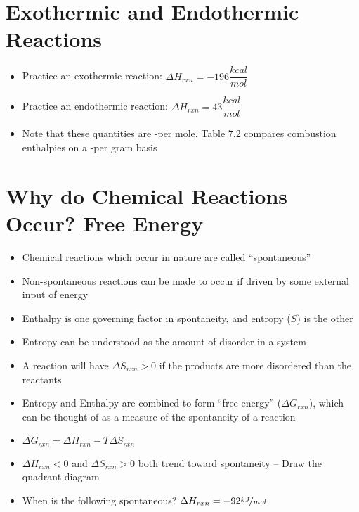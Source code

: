 \documentclass[12pt, openany, letterpaper]{memoir}
\begin{document}
\section{Exothermic and Endothermic Reactions}
\begin{itemize}
	\item Practice an exothermic reaction:  \hspace{1em} $\Delta H_{rxn}=-196\dfrac{kcal}{mol}$
	\item Practice an endothermic reaction:  \hspace{1em} $\Delta H_{rxn}=43\dfrac{kcal}{mol}$
	\item Note that these quantities are -per mole. Table 7.2 compares combustion enthalpies on a -per gram basis
\end{itemize}

\section{Why do Chemical Reactions Occur? Free Energy}
\begin{itemize}
	\item Chemical reactions which occur in nature are called ``spontaneous''
	\item Non-spontaneous reactions can be made to occur if driven by some external input of energy
	\item Enthalpy is one governing factor in spontaneity, and entropy ($S$) is the other
	\item Entropy can be understood as the amount of disorder in a system
	\item A reaction will have $\Delta S_{rxn}>0$ if the products are more disordered than the reactants
	\item Entropy and Enthalpy are combined to form ``free energy'' ($\Delta G_{rxn}$), which can be thought of as a measure of the spontaneity of a reaction
	\item $\Delta G_{rxn} = \Delta H_{rxn} - T\Delta S_{rxn}$
	\item $\Delta H_{rxn}<0$ and $\Delta S_{rxn}>0$ both trend toward spontaneity -- Draw the quadrant diagram
  \item When is the following spontaneous?  \hspace{1em} $\Delta H_{rxn}=-92\nicefrac{kJ}{mol}$
\end{itemize}
\end{document}
